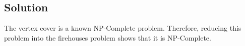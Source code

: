 \subsection*{Solution}

The vertex cover is a known NP-Complete problem. Therefore, reducing this problem into the firehouses problem shows that it is NP-Complete.
